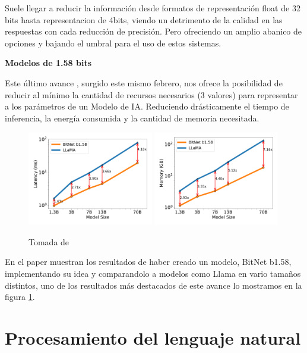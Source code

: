 Suele llegar a reducir la información desde formatos de representación float de 32 bits hasta representacion de 4bits, viendo un detrimento de la calidad en las respuestas con cada reducción de precisión. Pero ofreciendo un amplio abanico de opciones y bajando el umbral para el uso de estos sistemas.

\textbf{Modelos de 1.58 bits}

Este último avance \cite{ma2024era}, surgido este mismo febrero, nos ofrece la posibilidad de reducir al mínimo la cantidad de recursos necesarios (3 valores) para representar a los parámetros de un Modelo de IA. Reduciendo drásticamente el tiempo de inferencia, la energía consumida y la cantidad de memoria necesitada.

\begin{figure}[thb]
    \centering
    \includegraphics[width=0.49\textwidth]{Imagenes/Vectorial/plot-latencia.pdf}
    \includegraphics[width=0.49\textwidth]{Imagenes/Vectorial/plot-memoria.pdf}
    \caption{Tomada de \cite{ma2024era}}
    \label{fig:latencia-memoria}
\end{figure}

En el paper muestran los resultados de haber creado un modelo, BitNet b1.58, implementando su idea y comparandolo a modelos como Llama en vario tamaños distintos, uno de los resultados más destacados de este avance lo mostramos en la figura \ref{fig:latencia-memoria}.

\section{Procesamiento del lenguaje natural}

